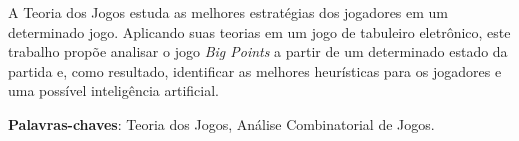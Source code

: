 \begin{resumo}

A Teoria dos Jogos estuda as melhores estratégias dos jogadores em um
determinado jogo. Aplicando suas teorias em um jogo de tabuleiro
eletrônico, este trabalho propõe analisar o jogo \emph{Big Points} a
partir de um determinado estado da partida e, como resultado,
identificar as melhores heurísticas para os jogadores e uma possível
inteligência artificial.

 \vspace{\onelineskip}

 \noindent
 \textbf{Palavras-chaves}: Teoria dos Jogos, Análise Combinatorial de Jogos.
\end{resumo}
